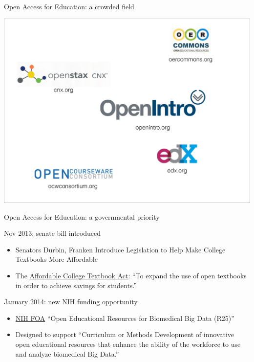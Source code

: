 
\begin{frame}{Open Access for Education: a crowded field}

\includegraphics[width=\linewidth]{openEdLogos}

\end{frame}


\begin{frame}{Open Access for Education: a governmental priority}

\begin{block}{Nov 2013: senate bill introduced}
\begin{itemize}
\item Senators Durbin, Franken Introduce Legislation to Help Make College Textbooks More Affordable

\item The \href{http://thomas.loc.gov/cgi-bin/query/z?c113:S.1704:}{Affordable College Textbook Act}: ``To expand the use of open textbooks in order to achieve savings for students.''
\end{itemize}
\end{block}

\begin{block}{January 2014: new NIH funding opportunity}
\begin{itemize}
\item \href{http://grants.nih.gov/grants/guide/rfa-files/RFA-HG-14-009.html}{NIH FOA} ``Open Educational Resources for Biomedical Big Data (R25)''
\item Designed to support ``Curriculum or Methods Development of innovative open educational resources that enhance the ability of the workforce to use and analyze biomedical Big Data.''
\end{itemize}
\end{block}

\end{frame}



